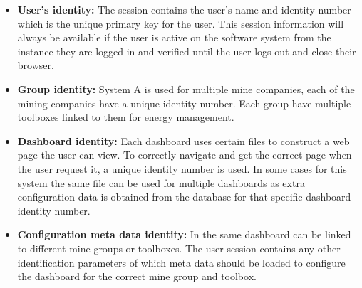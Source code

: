 \begin{itemize}
	\item \textbf{User's identity:} The session contains the user's name and identity number which is the unique primary key for the user. This session information will always be available if the user is active on the software system from the instance they are logged in and verified until the user logs out and close their browser.
	\item \textbf{Group identity:} System A is used for multiple mine companies, each of the mining companies have a unique identity number. Each group have multiple toolboxes linked to them for energy management.
	\item \textbf{Dashboard identity:} Each dashboard uses certain files to construct a web page the user can view. To correctly navigate and get the correct page when the user request it, a unique identity number is used. In some cases for this system the same file can be used for multiple dashboards as extra configuration data is obtained from the database for that specific dashboard identity number.
	\item \textbf{Configuration meta data identity:} In  the same dashboard can be linked to different mine groups or toolboxes. The user session contains any other identification parameters of which meta data should be loaded to configure the dashboard for the correct mine group and toolbox.
\end{itemize}

